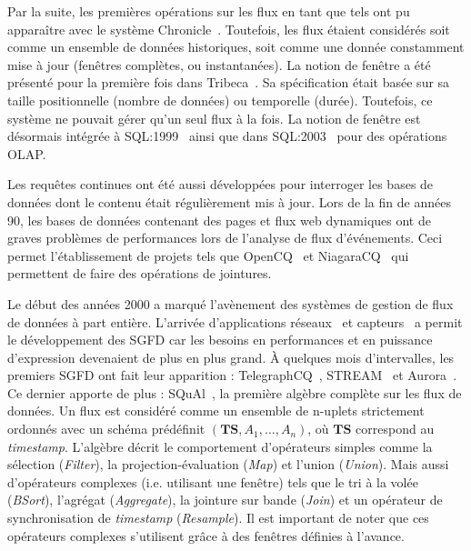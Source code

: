 Par la suite, les premières opérations sur les flux en tant que tels ont pu apparaître avec le système Chronicle~\cite{Jagadish:chronicle}. Toutefois, les flux étaient considérés soit comme un ensemble de données historiques, soit comme une donnée constamment mise à jour (fenêtres complètes, ou instantanées). La notion de fenêtre a été présenté pour la première fois dans Tribeca~\cite{Sullivan:tribeca,Sullivan:tribeca2}. Sa spécification était basée sur sa taille positionnelle (nombre de données) ou temporelle (durée). Toutefois, ce système ne pouvait gérer qu'un seul flux à la fois. La notion de fenêtre est désormais intégrée à SQL:1999~\cite{Melton:sql1999} ainsi que dans SQL:2003~\cite{Eisenberg:sql2003} pour des opérations OLAP.

Les requêtes continues ont été aussi développées pour interroger les bases de données dont le contenu était régulièrement mis à jour. Lors de la fin de années 90, les bases de données contenant des pages et flux web dynamiques ont de graves problèmes de performances lors de l'analyse de flux d'événements. Ceci permet l'établissement de projets tels que OpenCQ~\cite{Liu:opencq} et NiagaraCQ~\cite{Chen:niagaracq} qui permettent de faire des opérations de jointures.

Le début des années 2000 a marqué l'avènement des systèmes de gestion de flux de données à part entière. L'arrivée d'applications réseaux~\cite{Cranor:gigascope} et capteurs~\cite{Madden:tag,Yao:cougar} a permit le développement des SGFD car les besoins en performances et en puissance d'expression devenaient de plus en plus grand. À quelques mois d'intervalles, les premiers SGFD ont fait leur apparition : TelegraphCQ~\cite{Chandrasekaran:telegraphcq}, STREAM~\cite{Widom:queries} et Aurora~\cite{Carney:monitoring}. Ce dernier apporte de plus : SQuAl~\cite{Abadi:aurora}, la première algèbre complète sur les flux de données. Un flux est considéré comme un ensemble de n-uplets strictement ordonnés avec un schéma prédéfinit $(\textbf{TS}, A_1,\dots, A_n)$, où $\textbf{TS}$ correspond au \textit{timestamp}. L'algèbre décrit le comportement d'opérateurs simples comme la sélection (\textit{Filter}), la projection-évaluation (\textit{Map}) et l'union (\textit{Union}). Mais aussi d'opérateurs complexes (i.e. utilisant une fenêtre) tels que le tri à la volée (\textit{BSort}), l'agrégat (\textit{Aggregate}), la jointure sur bande (\textit{Join}) et un opérateur de synchronisation de \textit{timestamp} (\textit{Resample}). Il est important de noter que ces opérateurs complexes s'utilisent grâce à des fenêtres définies à l'avance.

